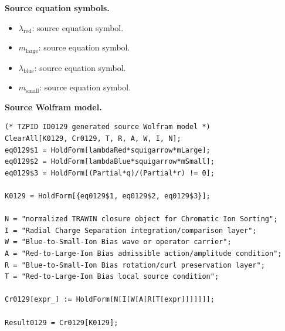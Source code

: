 \begin{minipage}[t]{0.49\linewidth}
\begingroup
\small
\raggedright
\textbf{Source equation symbols.}\par
\begin{itemize}[leftmargin=1.35em,itemsep=1pt,topsep=1pt,parsep=0pt]
    \item $\lambda_{\mathrm{red}}$: source equation symbol.
    \item $m_{\mathrm{large}}$: source equation symbol.
    \item $\lambda_{\mathrm{blue}}$: source equation symbol.
    \item $m_{\mathrm{small}}$: source equation symbol.
\end{itemize}
\endgroup
\end{minipage}\hfill
\begin{minipage}[t]{0.47\linewidth}
\begingroup
\scriptsize
\raggedright
\textbf{Source Wolfram model.}\par
\begin{Verbatim}[fontsize=\tiny,breaklines=true,breakanywhere=true]
(* TZPID ID0129 generated source Wolfram model *)
ClearAll[K0129, Cr0129, T, R, A, W, I, N];
eq0129$1 = HoldForm[lambdaRed*squigarrow*mLarge];
eq0129$2 = HoldForm[lambdaBlue*squigarrow*mSmall];
eq0129$3 = HoldForm[(Partial*q)/(Partial*r) != 0];

K0129 = HoldForm[{eq0129$1, eq0129$2, eq0129$3}];

N = "normalized TRAWIN closure object for Chromatic Ion Sorting";
I = "Radial Charge Separation integration/comparison layer";
W = "Blue-to-Small-Ion Bias wave or operator carrier";
A = "Red-to-Large-Ion Bias admissible action/amplitude condition";
R = "Blue-to-Small-Ion Bias rotation/curl preservation layer";
T = "Red-to-Large-Ion Bias local source condition";

Cr0129[expr_] := HoldForm[N[I[W[A[R[T[expr]]]]]]];

Result0129 = Cr0129[K0129];
\end{Verbatim}
\endgroup
\end{minipage}

